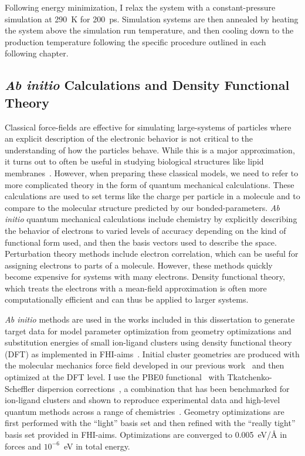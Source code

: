 Following energy minimization, I relax the system with a constant-pressure
simulation at 290~K for 200~ps. Simulation systems are then annealed by heating the system above the
simulation run temperature, and then cooling down to the production temperature following the
specific procedure outlined in each following chapter.

\subsection{\emph{Ab initio} Calculations and Density Functional Theory}
Classical force-fields are effective for simulating large-systems of particles where an explicit description of 
the electronic behavior is not critical to the understanding of how the particles behave. While this is a major 
approximation, it turns out to often be useful in studying biological structures like lipid membranes~\cite{berkowitz:2019}.
However, when preparing these classical models, we need to refer to more complicated theory in the form 
of quantum mechanical calculations. These calculations are used to set terms like the 
charge per particle in a molecule and to compare to the molecular structure predicted by our bonded-parameters.
\emph{Ab initio} quantum mechanical calculations include chemistry by explicitly describing the behavior of electrons to varied 
levels of accuracy depending on the kind of functional form used, and then the basis vectors used to describe the space.
Perturbation theory methods include electron correlation, which can be useful for assigning electrons to parts of a molecule. 
However, these methods quickly become expensive for systems with many electrons. Density functional theory, which treats the electrons 
with a mean-field approximation is often more computationally efficient and can thus be applied to larger systems.

\emph{Ab initio} methods are used in the works included in this dissertation to generate target data for 
model parameter optimization from geometry
optimizations and substitution energies of small ion-ligand clusters
using density functional theory (DFT) as implemented in
FHI-aims~\cite{fhiaims}. Initial cluster geometries are produced with
the molecular mechanics force field developed in our previous
work~\cite{kruczek:2017,saunders:2019} and then optimized at the DFT
level. I use the PBE0 functional~\cite{perdew:1996:generalized,adamo:1999:toward}
with Tkatchenko-Scheffler dispersion corrections~\cite{tkatchenko:2009},
a combination that has been benchmarked for ion-ligand clusters and shown
to reproduce experimental data and high-level quantum methods across a
range of chemistries~\cite{wineman:2019,wineman:2020:transferable,wineman:2020:improved}.
Geometry optimizations are first performed with the ``light'' basis set
and then refined with the ``really tight'' basis set provided in
FHI-aims. Optimizations are converged to 0.005~eV/\AA{} in forces and
$10^{-6}$~eV in total energy.  

